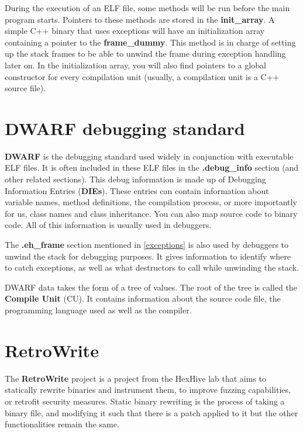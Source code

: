 \documentclass[a4paper,11pt,oneside]{report}
\begin{document}
During the execution of an ELF file, some methods will be run before the main
program starts. Pointers to these methods are stored in the
\textbf{init\_array}.
A simple C++ binary that uses exceptions will have an initialization array
containing a pointer to the \textbf{frame\_dummy}. This method is in charge of
setting up the stack frames to be able to unwind the frame during exception
handling later on.
In the initialization array, you will also find pointers to a global
constructor for every compilation unit (usually, a compilation unit is a C++
source file).

\section{DWARF debugging standard}
\label{dwarf}

\textbf{DWARF} is the debugging standard used widely in conjunction with 
executable ELF files.
It is often included in these ELF files in the \textbf{.debug\_info} section 
(and other related sections).
This debug information is made up of Debugging Information Entries 
(\textbf{DIEs}).
These entries can contain information about variable names, method definitions, 
the compilation process, or more importantly for us, class names and class 
inheritance. You can also map source code to binary code.
All of this information is usually used in debuggers.

The \textbf{.eh\_frame} section mentioned in \autoref{exceptions} is also used
by debuggers to unwind the stack for debugging purposes.
It gives information to identify where to catch exceptions, as well as what
destructors to call while unwinding the stack.

DWARF data takes the form of a tree of values.
The root of the tree is called the \textbf{Compile Unit} (CU).
It contains information about the source code file, the programming language
used as well as the compiler.

\section{RetroWrite} \label{retrowritesection}


The \textbf{RetroWrite}\cite{dinesh20oakland} project is a project from the
HexHive lab that aims to statically rewrite binaries and instrument them, to
improve fuzzing capabilities, or retrofit security measures.
Static binary rewriting is the process of taking a binary file, and modifying
it such that there is a patch applied to it but the other functionalities
remain the same.
\end{document}
